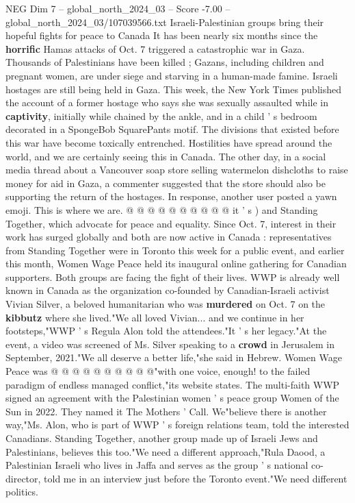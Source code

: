 \begin{textsample}{NEG Dim 7 – global\_north\_2024\_03 – Score -7.00 – global\_north\_2024\_03/107039566.txt}  \label{ex:f7_neg_236}
Israeli-Palestinian groups bring their hopeful fights for peace to Canada It has been nearly six months since the \textbf{horrific} Hamas attacks of Oct. 7 triggered a catastrophic war in Gaza.
Thousands of Palestinians have been killed ; Gazans, including children and pregnant women, are under siege and starving in a human-made famine.
Israeli hostages are still being held in Gaza.
This week, the New York Times published the account of a former hostage who says she was sexually assaulted while in \textbf{captivity}, initially while chained by the ankle, and in a child ' s bedroom decorated in a SpongeBob SquarePants motif.
The divisions that existed before this war have become toxically entrenched.
Hostilities have spread around the world, and we are certainly seeing this in Canada.
The other day, in a social media thread about a Vancouver soap store selling watermelon dishcloths to raise money for aid in Gaza, a commenter suggested that the store should also be supporting the return of the hostages.
In response, another user posted a yawn emoji.
This is where we are. @ @ @ @ @ @ @ @ @ @ it ' s ) and Standing Together, which advocate for peace and equality.
Since Oct. 7, interest in their work has surged globally and both are now active in Canada : representatives from Standing Together were in Toronto this week for a public event, and earlier this month, Women Wage Peace held its inaugural online gathering for Canadian supporters.
Both groups are facing the fight of their lives.
WWP is already well known in Canada as the organization co-founded by Canadian-Israeli activist Vivian Silver, a beloved humanitarian who was \textbf{murdered} on Oct. 7 on the \textbf{kibbutz} where she lived."We all loved Vivian... and we continue in her footsteps,"WWP ' s Regula Alon told the attendees."It ' s her legacy."At the event, a video was screened of Ms.
Silver speaking to a \textbf{crowd} in Jerusalem in September, 2021."We all deserve a better life,"she said in Hebrew.
Women Wage Peace was @ @ @ @ @ @ @ @ @ @"with one voice, enough! to the failed paradigm of endless managed conflict,"its website states.
The multi-faith WWP signed an agreement with the Palestinian women ' s peace group Women of the Sun in 2022.
They named it The Mothers ' Call.
We"believe there is another way,"Ms.
Alon, who is part of WWP ' s foreign relations team, told the interested Canadians.
Standing Together, another group made up of Israeli Jews and Palestinians, believes this too."We need a different approach,"Rula Daood, a Palestinian Israeli who lives in Jaffa and serves as the group ' s national co-director, told me in an interview just before the Toronto event."We need different politics.

\end{textsample}
